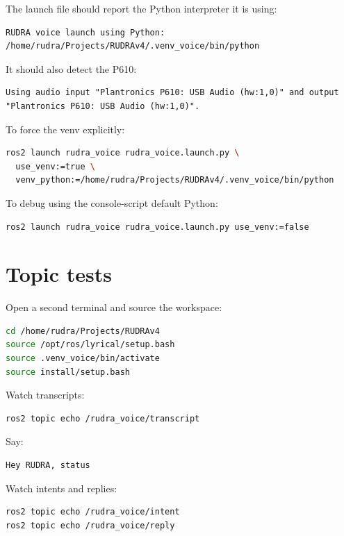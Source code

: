 The launch file should report the Python interpreter it is using:

\begin{lstlisting}
RUDRA voice launch using Python: /home/rudra/Projects/RUDRAv4/.venv_voice/bin/python
\end{lstlisting}

It should also detect the P610:

\begin{lstlisting}
Using audio input "Plantronics P610: USB Audio (hw:1,0)" and output "Plantronics P610: USB Audio (hw:1,0)".
\end{lstlisting}

To force the venv explicitly:

\begin{lstlisting}[language=bash]
ros2 launch rudra_voice rudra_voice.launch.py \
  use_venv:=true \
  venv_python:=/home/rudra/Projects/RUDRAv4/.venv_voice/bin/python
\end{lstlisting}

To debug using the console-script default Python:

\begin{lstlisting}[language=bash]
ros2 launch rudra_voice rudra_voice.launch.py use_venv:=false
\end{lstlisting}

\section{Topic tests}

Open a second terminal and source the workspace:

\begin{lstlisting}[language=bash]
cd /home/rudra/Projects/RUDRAv4
source /opt/ros/lyrical/setup.bash
source .venv_voice/bin/activate
source install/setup.bash
\end{lstlisting}

Watch transcripts:

\begin{lstlisting}[language=bash]
ros2 topic echo /rudra_voice/transcript
\end{lstlisting}

Say:

\begin{lstlisting}
Hey RUDRA, status
\end{lstlisting}

Watch intents and replies:

\begin{lstlisting}[language=bash]
ros2 topic echo /rudra_voice/intent
ros2 topic echo /rudra_voice/reply
\end{lstlisting}

